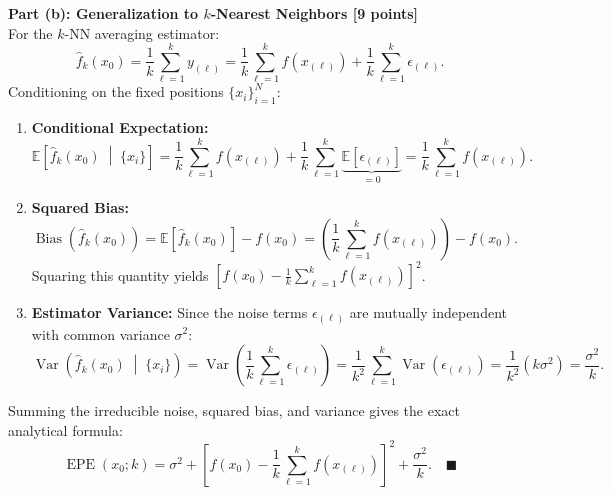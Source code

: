 \documentclass[11pt,a4paper]{article}
\begin{document}
\vspace{4pt}
\textbf{Part (b): Generalization to $k$-Nearest Neighbors [9 points]} \\
For the $k$-NN averaging estimator:
\[
  \hat{f}_k(x_0) = \frac{1}{k} \sum_{\ell=1}^k y_{(\ell)} = \frac{1}{k}\sum_{\ell=1}^k f(x_{(\ell)}) + \frac{1}{k}\sum_{\ell=1}^k \epsilon_{(\ell)}.
\]
Conditioning on the fixed positions $\{x_i\}_{i=1}^N$:
\begin{enumerate}[label=\arabic*., leftmargin=18pt, itemsep=3pt]
  \item \textbf{Conditional Expectation:}
  \[
    \mathbb{E}\left[\hat{f}_k(x_0) \;\middle|\; \{x_i\}\right] = \frac{1}{k}\sum_{\ell=1}^k f(x_{(\ell)}) + \frac{1}{k}\sum_{\ell=1}^k \underbrace{\mathbb{E}[\epsilon_{(\ell)}]}_{=0} = \frac{1}{k}\sum_{\ell=1}^k f(x_{(\ell)}).
  \]
  \item \textbf{Squared Bias:}
  \[
    \operatorname{Bias}\left(\hat{f}_k(x_0)\right) = \mathbb{E}\left[\hat{f}_k(x_0)\right] - f(x_0) = \left( \frac{1}{k}\sum_{\ell=1}^k f(x_{(\ell)}) \right) - f(x_0).
  \]
  Squaring this quantity yields $\left[ f(x_0) - \frac{1}{k}\sum_{\ell=1}^k f(x_{(\ell)}) \right]^2$.
  \item \textbf{Estimator Variance:} Since the noise terms $\epsilon_{(\ell)}$ are mutually independent with common variance $\sigma^2$:
  \[
    \operatorname{Var}\left(\hat{f}_k(x_0) \;\middle|\; \{x_i\}\right) = \operatorname{Var}\left( \frac{1}{k}\sum_{\ell=1}^k \epsilon_{(\ell)} \right) = \frac{1}{k^2} \sum_{\ell=1}^k \operatorname{Var}(\epsilon_{(\ell)}) = \frac{1}{k^2}(k \sigma^2) = \frac{\sigma^2}{k}.
  \]
\end{enumerate}
Summing the irreducible noise, squared bias, and variance gives the exact analytical formula:
\[
  \operatorname{EPE}(x_0; k) = \sigma^2 + \left[ f(x_0) - \frac{1}{k}\sum_{\ell=1}^k f(x_{(\ell)}) \right]^2 + \frac{\sigma^2}{k}. \quad \blacksquare
\]
\end{document}
